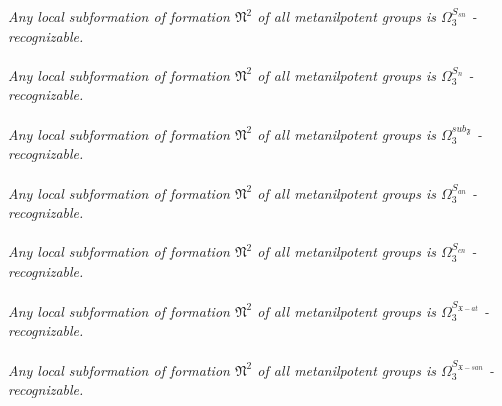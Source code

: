 \documentclass[a4paper,14pt]{extarticle}
\begin{document}
{\it Any local subformation of formation $\mathfrak{N}^2$ of all metanilpotent groups is $\Omega_3^{S_{sn}}$ - recognizable.} \\\\ 
{\it Any local subformation of formation $\mathfrak{N}^2$ of all metanilpotent groups is $\Omega_3^{S_n}$ - recognizable.} \\\\ 
{\it Any local subformation of formation $\mathfrak{N}^2$ of all metanilpotent groups is $\Omega_3^{sub_\mathfrak{F}}$ - recognizable.} \\\\ 
{\it Any local subformation of formation $\mathfrak{N}^2$ of all metanilpotent groups is $\Omega_3^{S_{an}}$ - recognizable.} \\\\ 
{\it Any local subformation of formation $\mathfrak{N}^2$ of all metanilpotent groups is $\Omega_3^{S_{cn}}$ - recognizable.} \\\\ 
{\it Any local subformation of formation $\mathfrak{N}^2$ of all metanilpotent groups is $\Omega_3^{S_{\mathfrak{X}-at}}$ - recognizable.} \\\\ 
{\it Any local subformation of formation $\mathfrak{N}^2$ of all metanilpotent groups is $\Omega_3^{S_{\mathfrak{X}-san}}$ - recognizable.} \\\\ 
\end{document}

